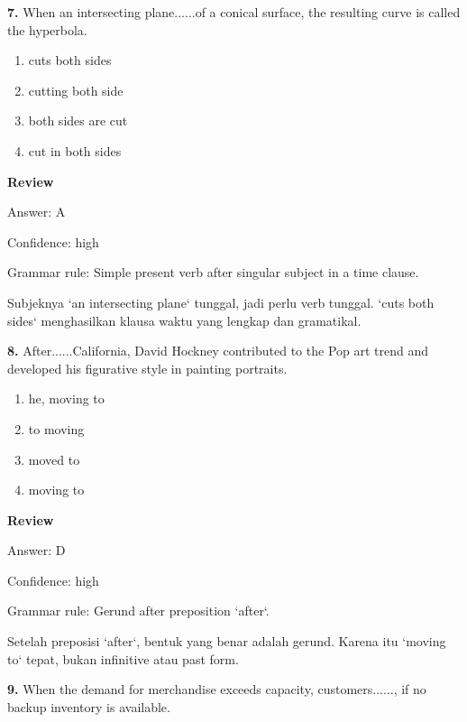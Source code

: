 \documentclass[12pt]{article}
\begin{document}
\endgroup
\par
\vspace{0.25\baselineskip}
\noindent\textbf{7.} When an intersecting plane......of a conical surface, the resulting curve is called the hyperbola.
\begin{enumerate}[label=(\Alph*),leftmargin=*,itemsep=0.2em]
\item cuts both sides
\item cutting both side
\item both sides are cut
\item cut in both sides
\end{enumerate}
\par
\begingroup
\setlength{\parskip}{0pt}
\setlength{\parindent}{0pt}
\textbf{Review}\par
Answer: A\par
Confidence: high\par
Grammar rule: Simple present verb after singular subject in a time clause.\par
Subjeknya `an intersecting plane` tunggal, jadi perlu verb tunggal. `cuts both sides` menghasilkan klausa waktu yang lengkap dan gramatikal.\par
\endgroup
\par
\vspace{0.25\baselineskip}
\noindent\textbf{8.} After......California, David Hockney contributed to the Pop art trend and developed his figurative style in painting portraits.
\begin{enumerate}[label=(\Alph*),leftmargin=*,itemsep=0.2em]
\item he, moving to
\item to moving
\item moved to
\item moving to
\end{enumerate}
\par
\begingroup
\setlength{\parskip}{0pt}
\setlength{\parindent}{0pt}
\textbf{Review}\par
Answer: D\par
Confidence: high\par
Grammar rule: Gerund after preposition `after`.\par
Setelah preposisi `after`, bentuk yang benar adalah gerund. Karena itu `moving to` tepat, bukan infinitive atau past form.\par
\endgroup
\par
\vspace{0.25\baselineskip}
\noindent\textbf{9.} When the demand for merchandise exceeds capacity, customers......, if no backup inventory is available.
\end{document}
